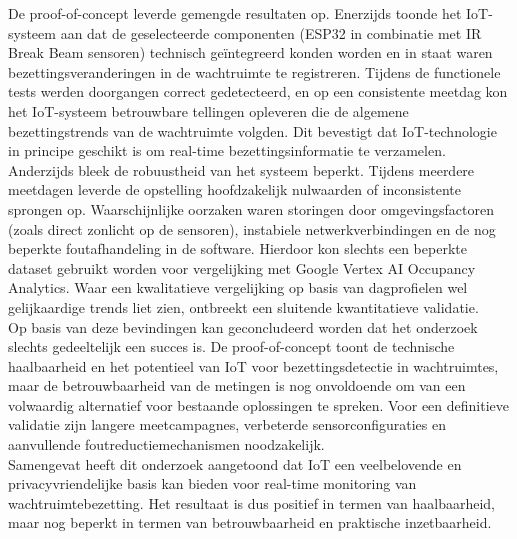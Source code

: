 De proof-of-concept leverde gemengde resultaten op. Enerzijds toonde het IoT-systeem aan dat de geselecteerde componenten (ESP32 in combinatie met IR Break Beam sensoren) technisch geïntegreerd konden worden en in staat waren bezettingsveranderingen in de wachtruimte te registreren. Tijdens de functionele tests werden doorgangen correct gedetecteerd, en op een consistente meetdag kon het IoT-systeem betrouwbare tellingen opleveren die de algemene bezettingstrends van de wachtruimte volgden. Dit bevestigt dat IoT-technologie in principe geschikt is om real-time bezettingsinformatie te verzamelen. \\

Anderzijds bleek de robuustheid van het systeem beperkt. Tijdens meerdere meetdagen leverde de opstelling hoofdzakelijk nulwaarden of inconsistente sprongen op. Waarschijnlijke oorzaken waren storingen door omgevingsfactoren (zoals direct zonlicht op de sensoren), instabiele netwerkverbindingen en de nog beperkte foutafhandeling in de software. Hierdoor kon slechts een beperkte dataset gebruikt worden voor vergelijking met Google Vertex AI Occupancy Analytics. Waar een kwalitatieve vergelijking op basis van dagprofielen wel gelijkaardige trends liet zien, ontbreekt een sluitende kwantitatieve validatie. \\

Op basis van deze bevindingen kan geconcludeerd worden dat het onderzoek slechts gedeeltelijk een succes is. De proof-of-concept toont de technische haalbaarheid en het potentieel van IoT voor bezettingsdetectie in wachtruimtes, maar de betrouwbaarheid van de metingen is nog onvoldoende om van een volwaardig alternatief voor bestaande oplossingen te spreken. Voor een definitieve validatie zijn langere meetcampagnes, verbeterde sensorconfiguraties en aanvullende foutreductiemechanismen noodzakelijk. \\

Samengevat heeft dit onderzoek aangetoond dat IoT een veelbelovende en privacyvriendelijke basis kan bieden voor real-time monitoring van wachtruimtebezetting. Het resultaat is dus positief in termen van haalbaarheid, maar nog beperkt in termen van betrouwbaarheid en praktische inzetbaarheid. \\



